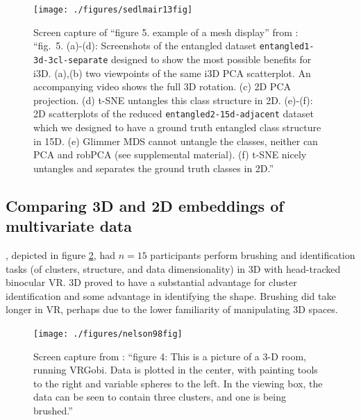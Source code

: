 \documentclass{monashthesis}
\begin{document}
\begin{figure}

{\centering \texttt{[image: ./figures/sedlmair13fig]} 

}

\caption{Screen capture of ``figure 5. example of a mesh display'' from \textcite{sedlmair_empirical_2013}: ``fig.~5. (a)-(d): Screenshots of the entangled dataset \texttt{entangled1-3d-3cl-separate} designed to show the most possible benefits for i3D. (a),(b) two viewpoints of the same i3D PCA scatterplot. An accompanying video shows the full 3D rotation. (c) 2D PCA projection. (d) t-SNE untangles this class structure in 2D. (e)-(f): 2D scatterplots of the reduced \texttt{entangled2-15d-adjacent} dataset which we designed to have a ground truth entangled class structure in 15D. (e) Glimmer MDS cannot untangle the classes, neither can PCA and robPCA (see supplemental material). (f) t-SNE nicely untangles and separates the ground truth classes in 2D.''}\label{fig:sedlmair13fig}
\end{figure}

\hypertarget{comparing-3d-and-2d-embeddings-of-multivariate-data}{%
\subsection{Comparing 3D and 2D embeddings of multivariate data}\label{comparing-3d-and-2d-embeddings-of-multivariate-data}}

\textcite{nelson_xgobi_1998}, depicted in figure \ref{fig:nelson98fig}, had \(n=15\) participants perform brushing and identification tasks (of clusters, structure, and data dimensionality) in 3D with head-tracked binocular VR. 3D proved to have a substantial advantage for cluster identification and some advantage in identifying the shape. Brushing did take longer in VR, perhaps due to the lower familiarity of manipulating 3D spaces.



\begin{figure}

{\centering \texttt{[image: ./figures/nelson98fig]} 

}

\caption{Screen capture from \textcite{nelson_xgobi_1998}: ``figure 4: This is a picture of a 3-D room, running VRGobi. Data is plotted in the center, with painting tools to the right and variable spheres to the left. In the viewing box, the data can be seen to contain three clusters, and one is being brushed.''}\label{fig:nelson98fig}
\end{figure}
\end{document}
